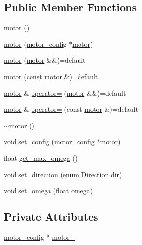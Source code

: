 \subsection*{Public Member Functions}
\begin{DoxyCompactItemize}
\item 
\mbox{\hyperlink{classmotor_aa844d5f5525d4074814c6eb442a5edee}{motor}} ()
\item 
\mbox{\hyperlink{classmotor_a9c01c3708164e16c70e1140011d308e4}{motor}} (\mbox{\hyperlink{structmotor__config}{motor\+\_\+config}} $\ast$\mbox{\hyperlink{classmotor}{motor}})
\item 
\mbox{\hyperlink{classmotor_a69ca4e0bdf735ca324b2a64a555613e6}{motor}} (\mbox{\hyperlink{classmotor}{motor}} \&\&)=default
\item 
\mbox{\hyperlink{classmotor_a95429da99ca065a6ba2dd9fd823a83f2}{motor}} (const \mbox{\hyperlink{classmotor}{motor}} \&)=default
\item 
\mbox{\hyperlink{classmotor}{motor}} \& \mbox{\hyperlink{classmotor_a56c0ac07ae4fe630290c25415f36f828}{operator=}} (\mbox{\hyperlink{classmotor}{motor}} \&\&)=default
\item 
\mbox{\hyperlink{classmotor}{motor}} \& \mbox{\hyperlink{classmotor_aaca163743034455779d02fd44e1c090e}{operator=}} (const \mbox{\hyperlink{classmotor}{motor}} \&)=default
\item 
\mbox{\hyperlink{classmotor_ae7c05cf12983ab16ecdfe8e34c4c7ffa}{$\sim$motor}} ()
\item 
void \mbox{\hyperlink{classmotor_a4580801b17e4b05384ab89ece8c3ca12}{set\+\_\+config}} (\mbox{\hyperlink{structmotor__config}{motor\+\_\+config}} $\ast$\mbox{\hyperlink{classmotor}{motor}})
\item 
float \mbox{\hyperlink{classmotor_a9c5b147bc6f5cc68d15286e4740a1e59}{get\+\_\+max\+\_\+omega}} ()
\item 
void \mbox{\hyperlink{classmotor_a788528b29d950ce81e3e9a41eb1977a3}{set\+\_\+direction}} (enum \mbox{\hyperlink{motor_8h_a224b9163917ac32fc95a60d8c1eec3aa}{Direction}} dir)
\item 
void \mbox{\hyperlink{classmotor_aafd4845142b5d311ea73331b3ae1bb33}{set\+\_\+omega}} (float omega)
\end{DoxyCompactItemize}
\subsection*{Private Attributes}
\begin{DoxyCompactItemize}
\item 
\mbox{\hyperlink{structmotor__config}{motor\+\_\+config}} $\ast$ \mbox{\hyperlink{classmotor_ab02539b935506b27e47fe9ae15213ea7}{motor\+\_\+}}
\end{DoxyCompactItemize}


